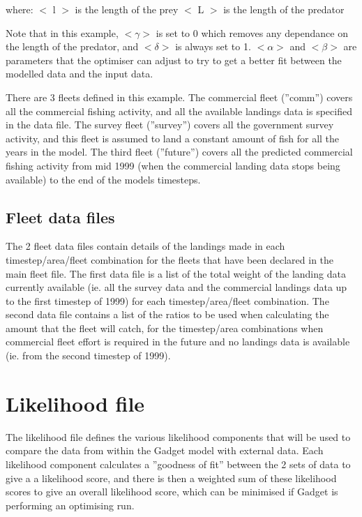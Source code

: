 \documentclass[10pt,titlepage]{article}
\begin{document}
where:\newline
$<$ l $>$ is the length of the prey\newline
$<$ L $>$ is the length of the predator

\bigskip
Note that in this example, $<\gamma>$ is set to 0 which removes any dependance on the length of the predator, and $<\delta>$ is always set to 1.   $<\alpha>$ and $<\beta>$ are parameters that the optimiser can adjust to try to get a better fit between the modelled data and the input data.

\bigskip
There are 3 fleets defined in this example.  The commercial fleet (''comm'') covers all the commercial fishing activity, and all the available landings data is specified in the data file.  The survey fleet (''survey'') covers all the government survey activity, and this fleet is assumed to land a constant amount of fish for all the years in the model.  The third fleet (''future'') covers all the predicted commercial fishing activity from mid 1999 (when the commercial landing data stops being available) to the end of the models timesteps.

{\small }

\subsection{Fleet data files}
The 2 fleet data files contain details of the landings made in each timestep/area/fleet combination for the fleets that have been declared in the main fleet file.  The first data file is a list of the total weight of the landing data currently available (ie. all the survey data and the commercial landings data up to the first timestep of 1999) for each timestep/area/fleet combination.  The second data file contains a list of the ratios to be used when calculating the amount that the fleet will catch, for the timestep/area combinations when commercial fleet effort is required in the future and no landings data is available (ie. from the second timestep of 1999).

{\small }
{\small }

\section{Likelihood file}
The likelihood file defines the various likelihood components that will be used to compare the data from within the Gadget model with external data.  Each likelihood component calculates a ''goodness of fit'' between the 2 sets of data to give a a likelihood score, and there is then a weighted sum of these likelihood scores to give an overall likelihood score, which can be minimised if Gadget is performing an optimising run.
\end{document}
